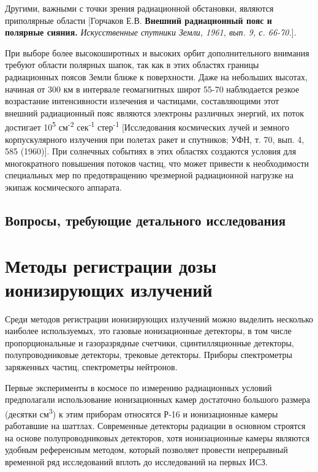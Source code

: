 Другими, важными с точки зрения радиационной обстановки, являются приполярные области [Горчаков Е.В. \textbf{Внешний радиационный пояс и полярные сияния. }\emph{Искусственные спутники Земли, 1961, вып. 9, с. 66-70.}].

При выборе более высокоширотных и высоких орбит дополнительного внимания требуют области полярных шапок, так как в этих областях границы радиационных поясов Земли ближе к поверхности. Даже на небольших высотах, начиная от 300 км в интервале геомагнитных широт 55-70 наблюдается резкое возрастание интенсивности излечения и частицами, составляющими этот внешний радиационный пояс являются электроны различных энергий, их поток достигает 10\textsuperscript{5} см\textsuperscript{-2} сек\textsuperscript{-1} стер\textsuperscript{-1} [Исследования космических лучей и земного корпускулярного излучения при полетах ракет и спутников; УФН, т. 70, вып. 4, 585 (1960)]. При солнечных событиях в этих областях создаются условия для многократного повышения потоков частиц, что может привести к необходимости специальных мер по предотвращению чрезмерной радиационной нагрузке на экипаж космического аппарата.
\subsection{Вопросы, требующие детального исследования}


\section{Методы регистрации дозы ионизирующих излучений} \label{sect1_2}

Среди методов регистрации ионизирующих излучений можно выделить несколько наиболее используемых, это газовые ионизационные детекторы, в том числе пропорциональные и газоразрядные счетчики, сцинтилляционные детекторы, полупроводниковые детекторы, трековые детекторы. Приборы спектрометры заряженных частиц, спектрометры нейтронов.

Первые эксперименты в космосе по измерению радиационных условий предполагали использование ионизационных камер достаточно большого размера (десятки см\textsuperscript{3}) к этим приборам относятся Р-16 и ионизационные камеры работавшие на шаттлах\cite{Dorman2004}. Современные детекторы радиации в основном строятся на основе полупроводниковых детекторов, хотя ионизационные камеры являются удобным референсным методом, который позволяет провести непрерывный временной ряд исследований вплоть до исследований на первых ИСЗ.

